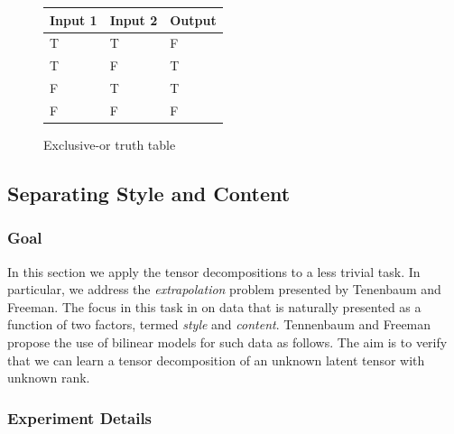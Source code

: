\begin{figure}
\begin{floatrow}
  {%
   \begin{tabu} to 0.3\textwidth {|X|X||X|}
	\hline
	Input 1 & Input 2 & Output \\
	\hline\hline
	T & T & F \\
	T & F & T \\
	F & T & T \\
	F & F & F \\
	\hline
	\end{tabu}%
  }
  {%
   \caption{Exclusive-or truth table}
   \label{tab:xor}%
  }
\end{floatrow}
\end{figure}

\subsection{Separating Style and Content}
\subsubsection{Goal}
In this section we apply the tensor decompositions to a less trivial task. In particular, we
address the \textit{extrapolation} problem presented by Tenenbaum and 
Freeman. \autocite{Tenenbaum2000} The focus in this task in on data that is naturally presented as a
function of two factors, termed \textit{style} and \textit{content}. Tennenbaum and Freeman
propose the use of bilinear models for such data as follows. The aim is to verify that we
can learn a tensor decomposition of an unknown latent tensor with unknown rank.

\subsubsection{Experiment Details}
